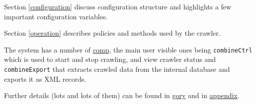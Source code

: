 Section \ref{configuration} discuss configuration structure and highlights a few important configuration variables.

Section \ref{operation} describes policies and methods used by the crawler.


The system has a number of \hyperref{components}{components (see
section }{)}{comp}, the main user visible ones being {\tt combineCtrl}
which is used to start and stop crawling, and view crawler status and
{\tt combineExport} that extracts crawled data from the internal
database and exports it as XML records.

Further details (lots and lots of them) can be found in \hyperref{'Gory details'}{part }{ 'Gory details'}{gory} and in \hyperref{the Appendix}{Appendix }{}{appendix}.
